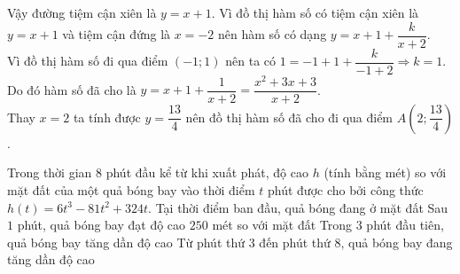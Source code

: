 \begin{ex}
{\begin{itemchoice}
Vậy đường tiệm cận xiên là $y=x+1$.
\itemch %
	Vì đồ thị hàm số có tiệm cận xiên là $y=x+1$ và tiệm cận đứng là $x=-2$ nên hàm số có dạng $y=x+1+\dfrac{k}{x+2}$.\\
	Vì đồ thị hàm số đi qua điểm $(-1;1)$ nên ta có $1=-1+1+\dfrac{k}{-1+2}\Rightarrow k=1$.\\
	Do đó hàm số đã cho là $y=x+1+\dfrac{1}{x+2}=\dfrac{x^2+3x+3}{x+2}$.\\
	Thay $x=2$ ta tính được $y=\dfrac{13}{4}$ nên đồ thị hàm số đã cho đi qua điểm $A\left(2;\dfrac{13}{4}\right)$.
		\end{itemchoice}
		}	
\end{ex}

\begin{ex}%
	Trong thời gian $8$ phút đầu kể từ khi xuất phát, độ cao $h$ (tính bằng mét) so với mặt đất của một quả bóng bay vào thời điểm $t$ phút được cho bởi công thức $h(t) = 6t^3 - 81t^2 +324t$.
	\choiceTF
	{\True Tại thời điểm ban đầu, quả bóng đang ở mặt đất}
	{Sau $1$ phút, quả bóng bay đạt độ cao $250$ mét so với mặt đất}
	{\True Trong $3$ phút đầu tiên, quả bóng bay tăng dần độ cao}
	{Từ phút thứ $3$ đến phút thứ $8$, quả bóng bay đang tăng dần độ cao}
\end{ex}

